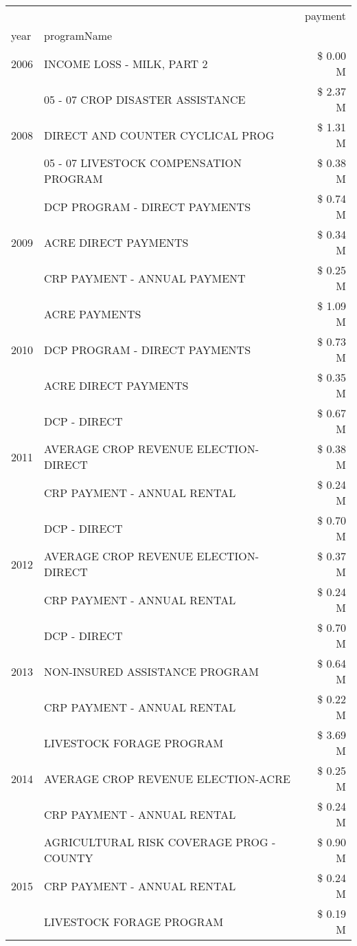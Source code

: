 \begin{tabular}{llr}
\toprule
 &  & payment \\
year & programName &  \\
\midrule
2006 & INCOME LOSS - MILK, PART 2 & \$ 0.00 M \\
\cline{1-3}
\multirow[t]{3}{*}{2008} & 05 - 07 CROP DISASTER ASSISTANCE & \$ 2.37 M \\
 & DIRECT AND COUNTER CYCLICAL PROG & \$ 1.31 M \\
 & 05 - 07 LIVESTOCK COMPENSATION PROGRAM & \$ 0.38 M \\
\cline{1-3}
\multirow[t]{3}{*}{2009} & DCP PROGRAM - DIRECT PAYMENTS & \$ 0.74 M \\
 & ACRE DIRECT PAYMENTS & \$ 0.34 M \\
 & CRP PAYMENT - ANNUAL PAYMENT & \$ 0.25 M \\
\cline{1-3}
\multirow[t]{3}{*}{2010} & ACRE PAYMENTS & \$ 1.09 M \\
 & DCP PROGRAM - DIRECT PAYMENTS & \$ 0.73 M \\
 & ACRE DIRECT PAYMENTS & \$ 0.35 M \\
\cline{1-3}
\multirow[t]{3}{*}{2011} & DCP - DIRECT & \$ 0.67 M \\
 & AVERAGE CROP REVENUE ELECTION-DIRECT & \$ 0.38 M \\
 & CRP PAYMENT - ANNUAL RENTAL & \$ 0.24 M \\
\cline{1-3}
\multirow[t]{3}{*}{2012} & DCP - DIRECT & \$ 0.70 M \\
 & AVERAGE CROP REVENUE ELECTION-DIRECT & \$ 0.37 M \\
 & CRP PAYMENT - ANNUAL RENTAL & \$ 0.24 M \\
\cline{1-3}
\multirow[t]{3}{*}{2013} & DCP - DIRECT & \$ 0.70 M \\
 & NON-INSURED ASSISTANCE PROGRAM & \$ 0.64 M \\
 & CRP PAYMENT - ANNUAL RENTAL & \$ 0.22 M \\
\cline{1-3}
\multirow[t]{3}{*}{2014} & LIVESTOCK FORAGE PROGRAM & \$ 3.69 M \\
 & AVERAGE CROP REVENUE ELECTION-ACRE & \$ 0.25 M \\
 & CRP PAYMENT - ANNUAL RENTAL & \$ 0.24 M \\
\cline{1-3}
\multirow[t]{3}{*}{2015} & AGRICULTURAL RISK COVERAGE PROG - COUNTY & \$ 0.90 M \\
 & CRP PAYMENT - ANNUAL RENTAL & \$ 0.24 M \\
 & LIVESTOCK FORAGE PROGRAM & \$ 0.19 M \\

\end{tabular}
